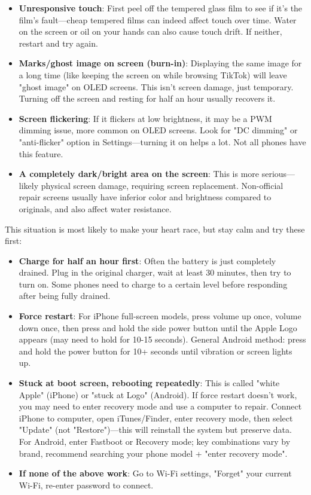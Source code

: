 
\begin{itemize}
  \item \textbf{Unresponsive touch}: First peel off the tempered glass film to see if it's the film's fault—cheap tempered films can indeed affect touch over time. Water on the screen or oil on your hands can also cause touch drift. If neither, restart and try again.
  \item \textbf{Marks/ghost image on screen (burn-in)}: Displaying the same image for a long time (like keeping the screen on while browsing TikTok) will leave "ghost image" on OLED screens. This isn't screen damage, just temporary. Turning off the screen and resting for half an hour usually recovers it.
  \item \textbf{Screen flickering}: If it flickers at low brightness, it may be a PWM dimming issue, more common on OLED screens. Look for "DC dimming" or "anti-flicker" option in Settings—turning it on helps a lot. Not all phones have this feature.
  \item \textbf{A completely dark/bright area on the screen}: This is more serious—likely physical screen damage, requiring screen replacement. Non-official repair screens usually have inferior color and brightness compared to originals, and also affect water resistance.
\end{itemize}


This situation is most likely to make your heart race, but stay calm and try these first:

\begin{itemize}
  \item \textbf{Charge for half an hour first}: Often the battery is just completely drained. Plug in the original charger, wait at least 30 minutes, then try to turn on. Some phones need to charge to a certain level before responding after being fully drained.
  \item \textbf{Force restart}: For iPhone full-screen models, press volume up once, volume down once, then press and hold the side power button until the Apple Logo appears (may need to hold for 10-15 seconds). General Android method: press and hold the power button for 10+ seconds until vibration or screen lights up.
  \item \textbf{Stuck at boot screen, rebooting repeatedly}: This is called "white Apple" (iPhone) or "stuck at Logo" (Android). If force restart doesn't work, you may need to enter recovery mode and use a computer to repair. Connect iPhone to computer, open iTunes/Finder, enter recovery mode, then select "Update" (not "Restore")—this will reinstall the system but preserve data. For Android, enter Fastboot or Recovery mode; key combinations vary by brand, recommend searching your phone model + "enter recovery mode".
  \item \textbf{If none of the above work}: Go to Wi-Fi settings, "Forget" your current Wi-Fi, re-enter password to connect.
\end{itemize}

